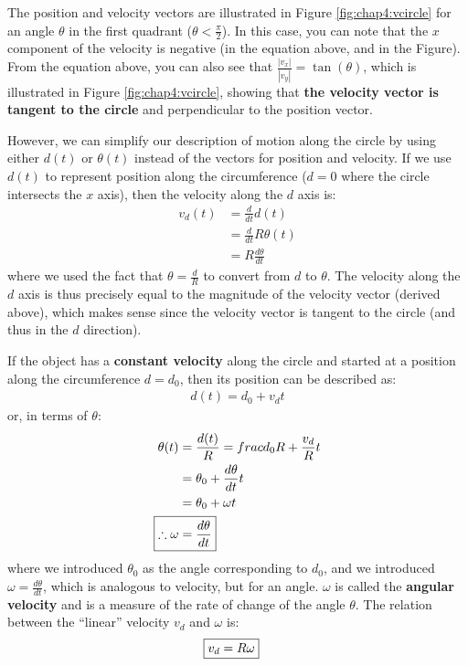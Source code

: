 The position and velocity vectors are illustrated in Figure \ref{fig:chap4:vcircle} for an angle $\theta$ in the first quadrant ($\theta<\frac{\pi}{2}$). In this case, you can note that the $x$ component of the velocity is negative (in the equation above, and in the Figure). From the equation above, you can also see that $\frac{|v_x|}{|v_y|}=\tan(\theta)$, which is illustrated in Figure \ref{fig:chap4:vcircle}, showing that \textbf{the velocity vector is tangent to the circle} and perpendicular to the position vector.

However, we can simplify our description of motion along the circle by using either $d(t)$ or $\theta(t)$ instead of the vectors for position and velocity. If we use $d(t)$ to represent position along the circumference ($d=0$ where the circle intersects the $x$ axis), then the velocity along the $d$ axis is:
\begin{align*}
v_d(t)&=\frac{d}{dt}d(t)\\
&=\frac{d}{dt}R\theta(t)\\
&=R\frac{d\theta}{dt}
\end{align*}
where we used the fact that $\theta=\frac{d}{R}$ to convert from $d$ to $\theta$. The velocity along the $d$ axis is thus precisely equal to the magnitude of the velocity vector (derived above), which makes sense since the velocity vector is tangent to the circle (and thus in the $d$ direction).

If the object has a \textbf{constant velocity} along the circle and started at a position along the circumference $d=d_0$, then its position can be described as:
\begin{align*}
d(t)=d_0+v_dt
\end{align*}
or, in terms of $\theta$:
\begin{align*}
\theta(t)&=\frac{d(t)}{R}=frac{d_0}{R}+\frac{v_d}{R}t\\
&=\theta_0 + \frac{d\theta}{dt}t\\
&=\theta_0 + \omega t\\
\Aboxed{\therefore \omega &= \frac{d\theta}{dt}}
\end{align*}
where we introduced $\theta_0$ as the angle corresponding to $d_0$, and we introduced $\omega=\frac{d\theta}{dt}$, which is analogous to velocity, but for an angle. $\omega$ is called the \textbf{angular velocity} and is a measure of the rate of change of the angle $\theta$. The relation between the ``linear'' velocity $v_d$ and $\omega$ is:
\begin{align*}
\Aboxed{v_d=R\omega }
\end{align*}

